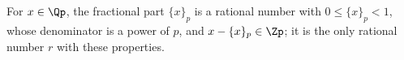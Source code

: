 For $x\in\Qp$, the fractional part $\{x\}_p$ is a rational number with $0\le\{x\}_p<1$, whose denominator is a power of $p$, and $x-\{x\}_p\in\Zp$; it is the only rational number $r$ with these properties.
